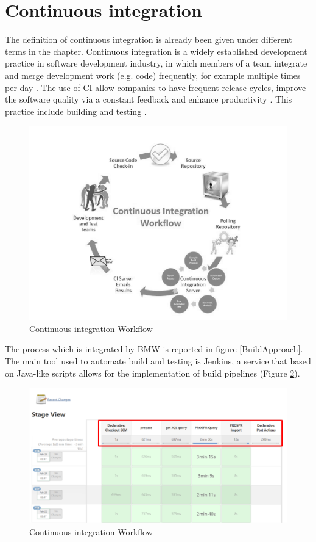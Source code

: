 \documentclass[../main.tex]{subfiles}
\begin{document}
\section{Continuous integration}
\label{sec:CIsec}
The definition of continuous integration is already been given under different terms in the chapter. Continuous integration is a widely established development practice in software development industry, in which members of a team integrate and merge development work (e.g. code) frequently, for example multiple times per day \cite{fitzgerald2017continuous}. The use of CI allow companies to have frequent release cycles, improve the software quality via a constant feedback and enhance productivity \cite{fitzgerald2017continuous}. This practice include building and testing \cite{7057604}.
\begin{figure}[h]
    \centering
    \includegraphics[width=0.8\linewidth]{images_folder/CI.jpg}
    \caption{Continuous integration Workflow}
    \label{fig:Continous Integration}
\end{figure}
The process which is integrated by \gls{BMW} is reported in figure \ref{BuildApproach}. The main tool used to automate build and testing is Jenkins, a service that based on Java-like scripts allows for the implementation of build pipelines (Figure \ref{fig:jkpipeline}). 
\begin{figure}[H]
    \centering
    \includegraphics[width=0.8\linewidth]{images_folder/jenkins pipeline.png}
    \caption{Continuous integration Workflow}
    \label{fig:jkpipeline}
\end{figure}
\end{document}
